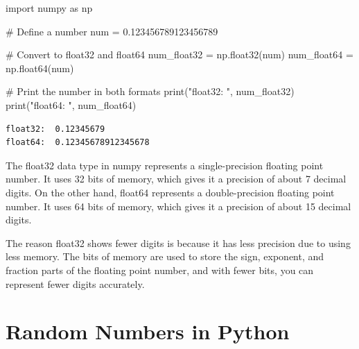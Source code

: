 \documentclass[
  letterpaper,
  DIV=11,
  numbers=noendperiod]{scrreprt}
\newenvironment{Shaded}{\begin{snugshade}}{\end{snugshade}}
\newcommand{\BuiltInTok}[1]{\textcolor[rgb]{0.00,0.23,0.31}{#1}}
\newcommand{\CommentTok}[1]{\textcolor[rgb]{0.37,0.37,0.37}{#1}}
\newcommand{\FloatTok}[1]{\textcolor[rgb]{0.68,0.00,0.00}{#1}}
\newcommand{\ImportTok}[1]{\textcolor[rgb]{0.00,0.46,0.62}{#1}}
\newcommand{\NormalTok}[1]{\textcolor[rgb]{0.00,0.23,0.31}{#1}}
\newcommand{\OperatorTok}[1]{\textcolor[rgb]{0.37,0.37,0.37}{#1}}
\newcommand{\StringTok}[1]{\textcolor[rgb]{0.13,0.47,0.30}{#1}}
\begin{document}
\begin{tcolorbox}[enhanced jigsaw, arc=.35mm, colback=white, bottomtitle=1mm, toprule=.15mm, coltitle=black, titlerule=0mm, leftrule=.75mm, title=\textcolor{quarto-callout-note-color}{\faInfo}\hspace{0.5em}{Example: 32 versus 64 bit}, opacitybacktitle=0.6, breakable, colbacktitle=quarto-callout-note-color!10!white, opacityback=0, toptitle=1mm, rightrule=.15mm, left=2mm, colframe=quarto-callout-note-color-frame, bottomrule=.15mm]

\begin{Shaded}
\begin{Highlighting}[]
\ImportTok{import}\NormalTok{ numpy }\ImportTok{as}\NormalTok{ np}

\CommentTok{\# Define a number}
\NormalTok{num }\OperatorTok{=} \FloatTok{0.123456789123456789}

\CommentTok{\# Convert to float32 and float64}
\NormalTok{num\_float32 }\OperatorTok{=}\NormalTok{ np.float32(num)}
\NormalTok{num\_float64 }\OperatorTok{=}\NormalTok{ np.float64(num)}

\CommentTok{\# Print the number in both formats}
\BuiltInTok{print}\NormalTok{(}\StringTok{"float32: "}\NormalTok{, num\_float32)}
\BuiltInTok{print}\NormalTok{(}\StringTok{"float64: "}\NormalTok{, num\_float64)}
\end{Highlighting}
\end{Shaded}

\begin{verbatim}
float32:  0.12345679
float64:  0.12345678912345678
\end{verbatim}

\end{tcolorbox}

The float32 data type in numpy represents a single-precision floating
point number. It uses 32 bits of memory, which gives it a precision of
about 7 decimal digits. On the other hand, float64 represents a
double-precision floating point number. It uses 64 bits of memory, which
gives it a precision of about 15 decimal digits.

The reason float32 shows fewer digits is because it has less precision
due to using less memory. The bits of memory are used to store the sign,
exponent, and fraction parts of the floating point number, and with
fewer bits, you can represent fewer digits accurately.

\hypertarget{random-numbers-in-python}{%
\section{Random Numbers in Python}\label{random-numbers-in-python}}
\end{document}

